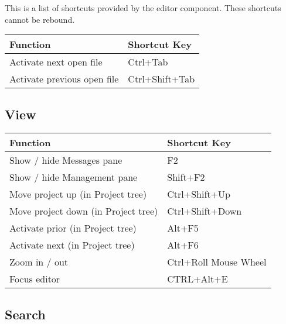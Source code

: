 This is a list of shortcuts provided by the \codeblocks editor component. These shortcuts cannot be rebound.

\begin{tabular}{|l|l|}\hline
Function 		            &	Shortcut Key\\ \hline
Activate next open file 	&   Ctrl+Tab\\ \hline
Activate previous open file &   Ctrl+Shift+Tab\\ \hline
\end{tabular}

\subsection{View}

\begin{tabular}{|l|l|}\hline
Function 		                    &	Shortcut Key\\ \hline
Show / hide Messages pane	        &	F2\\ \hline
Show / hide Management pane 	    &	Shift+F2\\ \hline
Move project up (in Project tree) 	&   Ctrl+Shift+Up\\ \hline
Move project down (in Project tree) &   Ctrl+Shift+Down\\ \hline
Activate prior (in Project tree)    & 	Alt+F5\\ \hline
Activate next (in Project tree)     &	Alt+F6\\ \hline
Zoom in / out 	                    &   Ctrl+Roll Mouse Wheel\\ \hline
Focus editor 	                    &   CTRL+Alt+E\\ \hline
\end{tabular}

\subsection{Search}

